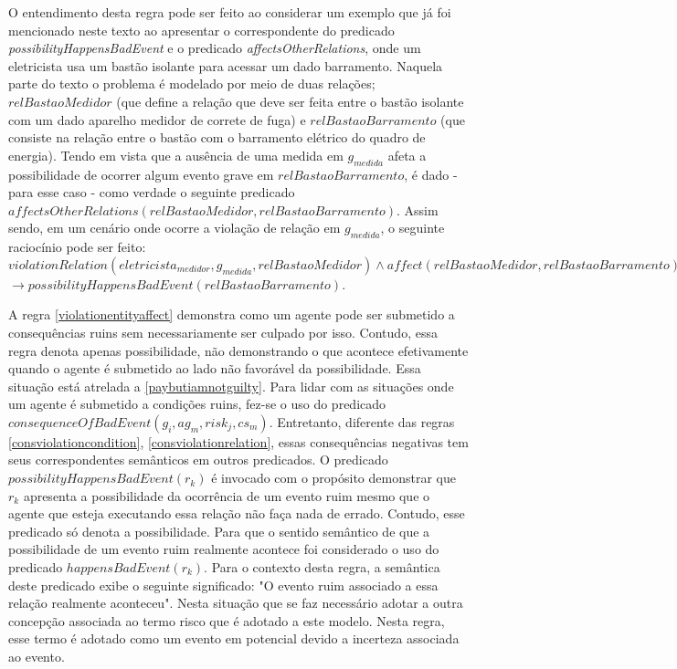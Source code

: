 O entendimento desta regra pode ser feito ao considerar um exemplo que já foi mencionado neste texto ao apresentar o correspondente do predicado \textit{possibilityHappensBadEvent} e o predicado \textit{affectsOtherRelations}, onde um eletricista usa um bastão isolante para acessar um dado barramento. Naquela parte do texto o problema é modelado por meio de duas relações; $relBastaoMedidor$ (que define a relação que deve ser feita entre o bastão isolante com um dado aparelho medidor de correte de fuga) e $relBastaoBarramento$ (que consiste na relação entre o bastão com o barramento elétrico do quadro de energia). Tendo em vista que a ausência de uma medida em $g_{medida}$ afeta a possibilidade de ocorrer algum evento grave em $relBastaoBarramento$, é dado - para esse caso - como verdade o seguinte predicado $affectsOtherRelations(relBastaoMedidor, relBastaoBarramento)$. Assim sendo, em um cenário onde ocorre a violação de relação em $g_{medida}$, o seguinte raciocínio pode ser feito: $violationRelation(eletricista_{medidor},g_{medida},relBastaoMedidor) \wedge affect(relBastaoMedidor, relBastaoBarramento) $ \\ $\to  possibilityHappensBadEvent(relBastaoBarramento)$.   

A regra \ref{violationentityaffect} demonstra como um agente pode ser submetido a consequências ruins sem necessariamente ser culpado por isso. Contudo, essa regra denota apenas possibilidade, não demonstrando o que acontece efetivamente quando o agente é submetido ao lado não favorável da possibilidade. Essa situação está atrelada a \ref{paybutiamnotguilty}. Para lidar com as situações onde um agente é submetido a condições ruins, fez-se o uso do predicado $consequenceOfBadEvent(g_i,ag_m,risk_j,cs_m) $. Entretanto, diferente das regras \ref{consviolationcondition}, \ref{consviolationrelation}, essas consequências negativas tem seus correspondentes semânticos em outros predicados. O predicado $possibilityHappensBadEvent(r_k)$ é invocado com o propósito demonstrar que $r_k$ apresenta a possibilidade da ocorrência de um evento ruim mesmo que o agente que esteja executando essa relação não faça nada de errado. Contudo, esse predicado só denota a possibilidade. Para que o sentido semântico de que a possibilidade de um evento ruim realmente acontece foi considerado o uso do predicado $happensBadEvent(r_k)$. Para o contexto desta regra, a semântica deste predicado exibe o seguinte significado: "O evento ruim associado a essa relação realmente aconteceu". Nesta situação que se faz necessário adotar a outra concepção associada ao termo risco que é adotado a este modelo. Nesta regra, esse termo é adotado como um evento em potencial devido a incerteza associada ao evento. 

